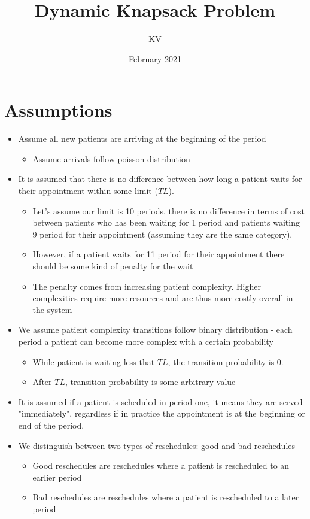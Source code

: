 \documentclass{article}
\title{Dynamic Knapsack Problem}
\author{KV}
\date{February 2021}
\begin{document}
\maketitle

\section{Assumptions} 
\begin{itemize}
	\item Assume all new patients are arriving at the beginning of the period 
	\begin{itemize}
		\item Assume arrivals follow poisson distribution
	\end{itemize}		
	
	\item It is assumed that there is no difference between how long a patient waits for their appointment within some limit ($TL$). 
	\begin{itemize}
		\item Let's assume our limit is 10 periods, there is no difference in terms of cost between patients who has been waiting for 1 period and patients waiting 9 period for their appointment (assuming they are the same category).  
		\item However, if a patient waits for 11 period for their appointment there should be some kind of penalty for the wait
		\item The penalty comes from increasing patient complexity. Higher complexities require more resources and are thus more costly overall in the system
	\end{itemize}		
	
	\item We assume patient complexity transitions follow binary distribution - each period a patient can become more complex with a certain probability
		\begin{itemize}
			\item While patient is waiting less that $TL$, the transition probability is 0.
			\item After $TL$, transition probability is some arbitrary value
		\end{itemize}
	
	\item It is assumed if a patient is scheduled in period one, it means they are served "immediately", regardless if in practice the appointment is at the beginning or end of the period.
	\item We distinguish between two types of reschedules: good and bad reschedules
	\begin{itemize}
		\item Good reschedules are reschedules where a patient is rescheduled to an earlier period
		\item Bad reschedules are reschedules where a patient is rescheduled to a later period
	\end{itemize}


\end{itemize}
\end{document}
